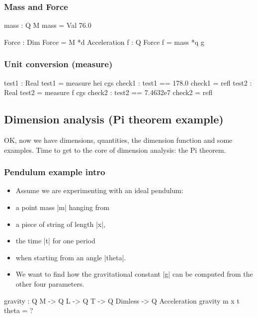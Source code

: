 \documentclass{article}
\begin{document}
\subsubsection{Mass and Force}
\label{sec:org64c2be3}
\begin{code}
  mass : Q M
  mass = Val 76.0

  Force : Dim
  Force = M *d Acceleration
  f : Q Force
  f = mass *q g
\end{code}
\subsubsection{Unit conversion (measure)}
\label{sec:org33dd6cb}
\begin{code}
  test1 : Real
  test1 = measure hei cgs
  check1 : test1 == 178.0
  check1 = refl
  test2 : Real
  test2 = measure f cgs
  check2 : test2 == 7.4632e7
  check2 = refl
\end{code}
\subsection{Dimension analysis (Pi theorem example)}
\label{sec:orgbf60df1}
OK, now we have dimensions, quantities, the dimension function and
some examples. Time to get to the core of dimension analysis: the Pi
theorem.

\subsubsection{Pendulum example intro}
\label{sec:org8d866e3}
\begin{itemize}
\item Assume we are experimenting with an ideal pendulum:
\item a point mass |m| hanging from
\item a piece of string of length |x|,
\item the time |t| for one period
\item when starting from an angle |theta|.
\item We want to find how the gravitational constant |g| can be computed
from the other four parameters.
\end{itemize}

\begin{spec}
  gravity : Q M -> Q L -> Q T -> Q Dimless -> Q Acceleration
  gravity m x t theta = ?
\end{spec}
\end{document}
